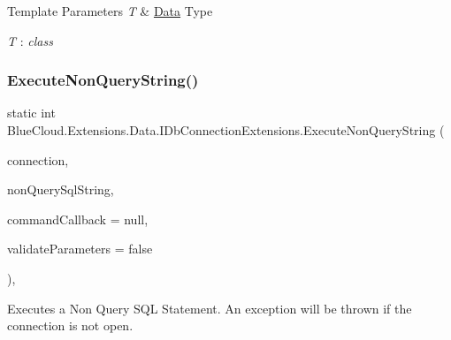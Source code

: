 \begin{DoxyTemplParams}{Template Parameters}
{\em T} & \mbox{\hyperlink{namespace_blue_cloud_1_1_extensions_1_1_data}{Data}} Type\\
\hline
\end{DoxyTemplParams}
\begin{Desc}
\item[Type Constraints]\begin{description}
\item[{\em T} : {\em class}]\end{description}
\end{Desc}
\mbox{\label{class_blue_cloud_1_1_extensions_1_1_data_1_1_i_db_connection_extensions_adfac9ac363eeb9545af9b3a662f438df}} 
\subsubsection{\texorpdfstring{Execute\+Non\+Query\+String()}{ExecuteNonQueryString()}}
{\footnotesize\ttfamily static int Blue\+Cloud.\+Extensions.\+Data.\+I\+Db\+Connection\+Extensions.\+Execute\+Non\+Query\+String (\begin{DoxyParamCaption}\item[{this I\+Db\+Connection}]{connection,  }\item[{string}]{non\+Query\+Sql\+String,  }\item[{Action$<$ I\+Db\+Command $>$}]{command\+Callback = {\ttfamily null},  }\item[{bool}]{validate\+Parameters = {\ttfamily false} }\end{DoxyParamCaption})\hspace{0.3cm}{\ttfamily [inline]}, {\ttfamily [static]}}



Executes a Non Query S\+QL Statement. An exception will be thrown if the connection is not open. 


